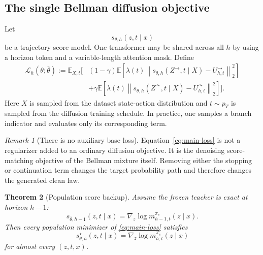 \documentclass[11pt]{article}
\newtheorem{theorem}{Theorem}
\theoremstyle{definition}
\theoremstyle{remark}
\newtheorem{remark}[theorem]{Remark}
\newcommand{\E}{\mathbb E}
\newcommand{\score}{s}
\newcommand{\Student}{\theta}
\newcommand{\Teacher}{\bar\theta}
\newcommand{\targetpi}{\pi_e}
\newcommand{\branchstop}{\rightarrow}
\newcommand{\branchcont}{\curvearrowright}
\begin{document}
\subsection{The single Bellman diffusion objective}

Let
\begin{equation}
\score_{\Student,h}
(z,t\mid x)
\end{equation}
be a trajectory score model. One transformer may be shared across all $h$ by
using a horizon token and a variable-length attention mask. Define
\begin{equation}
\boxed{
\begin{aligned}
\mathcal L_h(\Student;\Teacher)
:=
\E_{X,t}
\Big[
&(1-\gamma)
\E
\left[
\lambda(t)
\left\|
\score_{\Student,h}
(Z^{\branchstop},t\mid X)
-
U_{h,t}^{\branchstop}
\right\|_2^2
\right]
\\
&+
\gamma
\E
\left[
\lambda(t)
\left\|
\score_{\Student,h}
(Z^{\branchcont},t\mid X)
-
U_{h,t}^{\branchcont}
\right\|_2^2
\right]
\Big].
\end{aligned}
}
\label{eq:main-loss}
\end{equation}
Here $X$ is sampled from the dataset state-action distribution and
$t\sim p_T$ is sampled from the diffusion training schedule. In practice, one
samples a branch indicator and evaluates only its corresponding term.

\begin{remark}[There is no auxiliary base loss]
Equation~\eqref{eq:main-loss} is not a regularizer added to an ordinary
diffusion objective. It is the denoising score-matching objective of the
Bellman mixture itself. Removing either the stopping or continuation term
changes the target probability path and therefore changes the generated clean
law.
\end{remark}

\begin{theorem}[Population score backup]
\label{thm:population-score-backup}
Assume the frozen teacher is exact at horizon $h-1$:
\begin{equation}
\score_{\Teacher,h-1}(z,t\mid x)
=
\nabla_z\log m_{h-1,t}^{\targetpi}(z\mid x).
\label{eq:exact-teacher}
\end{equation}
Then every population minimizer of \cref{eq:main-loss} satisfies
\begin{equation}
\boxed{
\score_{\Student,h}^\star(z,t\mid x)
=
\nabla_z\log m_{h,t}^{\targetpi}(z\mid x)
}
\label{eq:exact-student-score}
\end{equation}
for almost every $(z,t,x)$.
\end{theorem}
\end{document}
